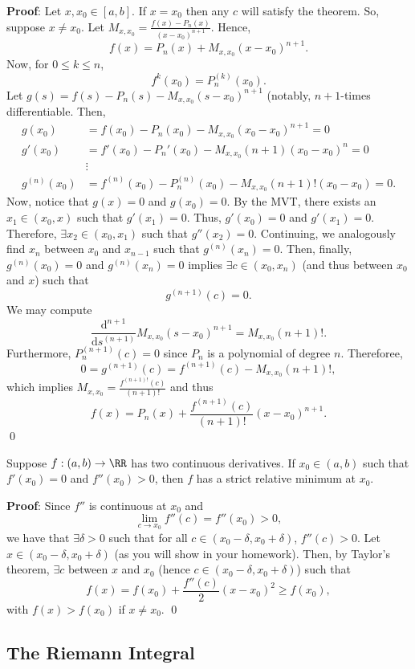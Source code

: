 \textbf{Proof}: Let $x,x_0\in [a,b]$. If $x=x_0$ then any $c$ will satisfy the theorem. So, suppose $x\neq x_0$. Let $M_{x,x_0} = \frac{f(x) -P_n(x)}{(x-x_0)^{n+1}}$. Hence,
\[
f(x) = P_n(x) + M_{x,x_0}(x-x_0)^{n+1}.
\]
Now, for $0\leq k \leq n$,
\[
f^k(x_0) = P_n^{(k)}(x_0).
\]
Let $g(s) = f(s) - P_n(s)-M_{x,x_0}(s-x_0)^{n+1}$ (notably, $n+1$-times differentiable. Then,
\begin{align*}
    g(x_0) &= f(x_0) -P_n(x_0) - M_{x,x_0}(x_0-x_0)^{n+1} = 0 \\
    g'(x_0) &= f'(x_0) - P_n'(x_0) - M_{x,x_0} (n+1)(x_0-x_0)^n = 0 \\
    ~&\vdots \\
    g^{(n)}(x_0) &= f^{(n)}(x_0) - P_n^{(n)}(x_0) - M_{x,x_0}(n+1)!(x_0-x_0) = 0.
\end{align*}
Now, notice that $g(x) = 0$ and $g(x_0) = 0$. By the MVT, there exists an $x_1\in (x_0,x)$ such that $g'(x_1) = 0$. Thus, $g'(x_0) = 0$ and $g'(x_1) = 0$. Therefore, $\exists x_2\in (x_0,x_1)$ such that $g''(x_2) = 0$. Continuing, we analogously find $x_n$ between $x_0$ and $x_{n-1}$ such that $g^{(n)}(x_n) = 0$. Then, finally, $g^{(n)}(x_0) = 0$ and $g^{(n)}(x_n) = 0$ implies $\exists c\in (x_0,x_n)$ (and thus between $x_0$ and $x$) such that 
\[
g^{(n+1)}(c) = 0.
\]
We may compute 
\[
\frac{\mathrm d^{n+1}}{\mathrm ds^{(n+1)}}M_{x,x_0} (s-x_0)^{n+1} = M_{x,x_0}(n+1)!.
\]
Furthermore, $P_n^{(n+1)} (c) = 0$ since $P_n$ is a polynomial of degree $n$. Thereforee, 
\[
0 = g^{(n+1)} (c) = f^{(n+1)}(c) - M_{x,x_0}(n+1)!,
\]
which implies $M_{x,x_0} = \frac{f^{(n+1)!}(c)}{(n+1)!}$ and thus 
\[
f(x) = P_n(x) + \frac{f^{(n+1)}(c)}{(n+1)!} (x-x_0)^{n+1}.
\]\qed 

\begin{theorem}
Suppose $f:(a,b) \to \RR$ has two continuous derivatives. If $x_0\in (a,b)$ such that $f'(x_0) = 0$ and $f''(x_0) >0$, then $f$ has a strict relative minimum at $x_0.$
\end{theorem}
\textbf{Proof}: Since $f''$ is continuous at $x_0$ and 
\[
\lim_{c\to x_0} f''(c) = f''(x_0)>0,
\]
we have that $\exists \delta>0$ such that for all $c\in (x_0-\delta, x_0+\delta)$, $f''(c) >0$. Let $x\in (x_0-\delta, x_0+\delta)$ (as you will show in your homework). Then, by Taylor's theorem, $\exists c$ between $x$ and $x_0$ (hence $c\in (x_0-\delta, x_0+\delta)$) such that 
\[
f(x) = f(x_0) + \frac{f''(c)}{2} (x-x_0)^2 \geq f(x_0),
\]
with $f(x) > f(x_0)$ if $x\neq x_0$. \qed 

\subsection*{The Riemann Integral}

